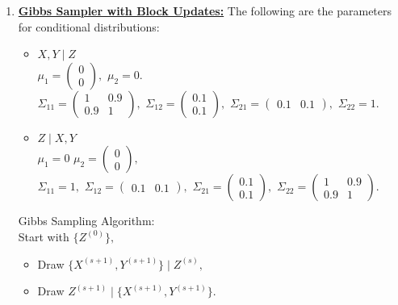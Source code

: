 \documentclass{article}
\begin{document}
\begin{enumerate}
\item {\underline{\textbf{Gibbs Sampler with Block Updates:}}} The following are the parameters for conditional distributions:\\
\begin{itemize}
\item $X,Y \mid Z$\\
$\mu_1 = \left(\begin{matrix}0\\0\end{matrix}\right),$
$\mu_2 = 0.$\\
$\Sigma_{11} = \left(\begin{matrix}1&0.9\\0.9&1\end{matrix}\right),$
$\Sigma_{12} = \left(\begin{matrix}0.1\\0.1\end{matrix}\right),$
$\Sigma_{21} = \left(\begin{matrix}0.1&0.1\end{matrix}\right),$
$\Sigma_{22} = 1.$\\
\item $Z \mid X,Y$\\
$\mu_1 = 0$
$\mu_2 = \left(\begin{matrix}0\\0\end{matrix}\right),$\\
$\Sigma_{11} = 1,$
$\Sigma_{12} = \left(\begin{matrix}0.1&0.1\end{matrix}\right),$
$\Sigma_{21} = \left(\begin{matrix}0.1\\0.1\end{matrix}\right),$
$\Sigma_{22} = \left(\begin{matrix}1&0.9\\0.9&1\end{matrix}\right).$\\
\end{itemize}

Gibbs Sampling Algorithm:\\

Start with $\{Z^{(0)}\},$ 
\begin{itemize}
\item Draw $\{X^{(s+1)},Y^{(s+1)}\} \mid Z^{(s)},$\\
\item Draw $Z^{(s+1)} \mid \{X^{(s+1)},Y^{(s+1)}\}.$
\end{itemize}


\end{enumerate}
\end{document}

